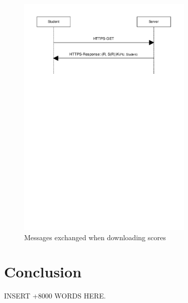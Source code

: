 \documentclass{article}
\begin{document}
\begin{figure}
\begin{center}
\includegraphics[width=0.75\textwidth]{images/download_scores.pdf}
\caption{Messages exchanged when downloading scores}
\label{fig:download-scores}
\end{center}
\end{figure}


\section{Conclusion}
\label{sec:conclusion}

INSERT +8000 WORDS HERE.
\end{document}
